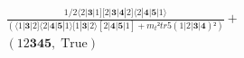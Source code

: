 \documentclass[varwidth, border=5pt]{standalone}
\begin{document}
\begin{my}
$\begin{gathered}
\scriptscriptstyle\frac{1/2⟨2|𝟑|1][2|𝟑|𝟒|2]⟨2|𝟒|𝟓|1⟩}{(⟨1|𝟑|2]⟨2|𝟒|𝟓|1⟩[1|𝟑|2⟩[2|𝟒|𝟓|1]+m_t²tr5(1|2|𝟑|𝟒)²)} +\\
\scriptscriptstyle(12𝟑𝟒𝟓,\;\text{True}) \phantom{+}
\end{gathered}$
\end{my}
\end{document}
